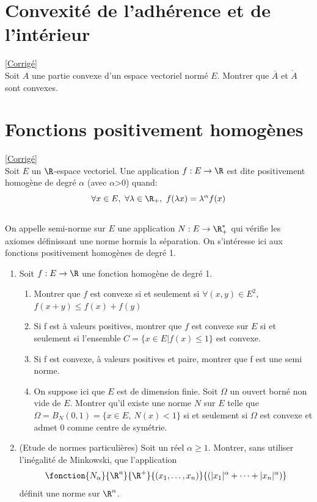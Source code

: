 \documentclass{book}
\begin{document}
\section{Convexité de l'adhérence et de l'intérieur }
\label{Convexité de l'adhérence et de l'intérieur}
\textcolor{blue}{\hyperref[sec:convexite-de-ladherence-et-de-linterieur]{[Corrigé]}}\\
Soit $A$ une partie convexe d'un espace vectoriel normé $E$. Montrer que $\overline A$ et $\ring A$ sont convexes.

\section{Fonctions positivement homogènes}
\label{FOnctions positivement homogènes}
\textcolor{blue}{\hyperref[sec:fonctions-positivement-homogenes]{[Corrigé]}}\\
Soit $E$ un $\R$-espace vectoriel. Une application $f:E\to\R$ est dite positivement homogène de degré $\alpha$ (avec $\alpha$>0) quand: $$\forall x\in E, \ \forall \lambda\in\R_+, \ f(\lambda x)=\lambda^{\alpha}f(x)$$
\\On appelle semi-norme sur $E$ une application $N: E\to\R_+^*$ qui vérifie les axiomes définissant une norme hormis la séparation. On s'intéresse ici aux fonctions positivement homogènes de degré 1.
\begin{enumerate}[leftmargin=*]
	\item Soit $f:E\to\R$ une fonction homogène de degré 1.
	\begin{enumerate}
		\item Montrer que $f$ est convexe si et seulement si $\forall(x,y)\in E^2$, $f(x+y)\leq f(x)+f(y)$
		\item Si f est à valeurs positives, montrer que $f$ est convexe sur $E$ si et seulement si l'ensemble $C=\{x\in E | f(x)\leq 1\}$ est convexe.
		\item Si f est convexe, à valeurs positives et paire, montrer que f est une semi norme.
		\item On suppose ici que $E$ est de dimension finie. Soit $\Omega$ un ouvert borné non vide de $E$. Montrer qu'il existe une norme $N$ sur $E$ telle que $\Omega=B_N(0,1)=\{x\in E,\ N(x)<1\}$ si et seulement si $\Omega$ est convexe et admet $0$ comme centre de symétrie.
	\end{enumerate}
	\item (Etude de normes particulières) Soit un réel $\alpha \geq 1$. Montrer, sans utiliser l'inégalité de Minkowski, que l'application $$\fonction{N_\alpha}{\R^n}{\R^+}{(x_1,\dots, x_n)}{(|x_1|^\alpha + \dots +|x_n|^\alpha)}$$ définit une norme sur $\R^n$.
\end{enumerate}
\end{document}
